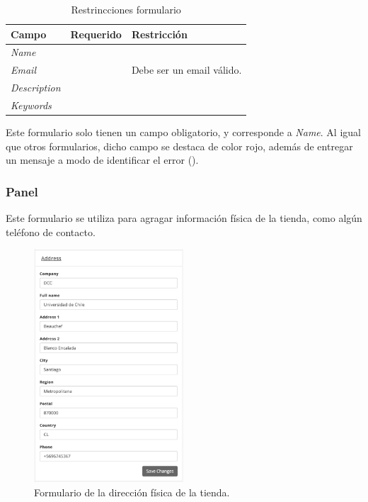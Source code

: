 \begin{table}[H]
    \centering
	\begin{tabular}{ |l|c||l| }
		\hline Campo & Requerido & Restricción \\ \hline
		\multirow{1}{*}{\textit{Name}} 			&  {\checkmark} &  \\ \hline
		\multirow{1}{*}{\textit{Email}} 		&  				&  Debe ser un email válido.\\ \hline
		\multirow{1}{*}{\textit{Description}} 	&  				&  \\ \hline
		\multirow{1}{*}{\textit{Keywords}} 		&  				&  \\ \hline
		\hline
	\end{tabular}
 	\caption{Restrincciones formulario \generalPanel}
    \label{tab:dashboard:ecommerce:form:general}
\end{table}


Este formulario solo tienen un campo obligatorio, y corresponde a \textit{Name}. Al igual que otros formularios, dicho campo se destaca de color rojo, además de entregar un mensaje a modo de identificar el error ().



\subsubsection*{Panel \addressPanel}

Este formulario se utiliza para agragar información física de la tienda, como algún teléfono de contacto.

\begin{figure}[H]
	\centering
	\includegraphics[width=0.5\textwidth]{figuras/dashboard/ecommerce/address/menu.png}
	\caption{Formulario de la dirección física de la tienda.}
	\label{figure:dashboard:ecommerce:address:menu}
\end{figure}

